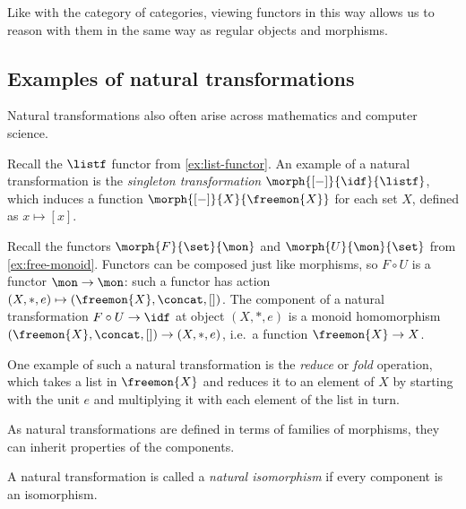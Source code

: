 Like with the category of categories, viewing functors in this way allows us to
reason with them in the same way as regular objects and morphisms.

\subsection{Examples of natural transformations}

Natural transformations also often arise across mathematics and
computer science.

\begin{example}
    Recall the \(\listf\) functor from \cref{ex:list-functor}.
    An example of a natural transformation is the
    \emph{singleton transformation} \(\morph{[-]}{\idf}{\listf}\), which
    induces a function \(\morph{[-]}{X}{\freemon{X}}\) for each set \(X\),
    defined as \(x \mapsto [x]\).
\end{example}

\begin{example}[Reduce]
    Recall the functors \(\morph{F}{\set}{\mon}\) and \(\morph{U}{\mon}{\set}\)
    from \cref{ex:free-monoid}.
    Functors can be composed just like morphisms, so \(F \circ U\) is a
    functor \(\mon \to \mon\): such a functor has action \(
    (X, *, e) \mapsto (\freemon{X}, \concat, [])
    \).
    The component of a natural transformation \(
    F \circ U \to \idf
    \) at object \((X, *, e)\) is a monoid homomorphism \(
    (\freemon{X}, \concat, []) \to (X, *, e)
    \), i.e.\ a function \(\freemon{X} \to X\).

    One example of such a natural transformation is the \emph{reduce} or
    \emph{fold} operation, which takes a list in \(\freemon{X}\) and reduces it
    to an element of \(X\) by starting with the unit \(e\) and multiplying it
    with each element of the list in turn.
\end{example}

As natural transformations are defined in terms of families of morphisms, they
can inherit properties of the components.

\begin{definition}
    A natural transformation is called a \emph{natural isomorphism} if every
    component is an isomorphism.
\end{definition}